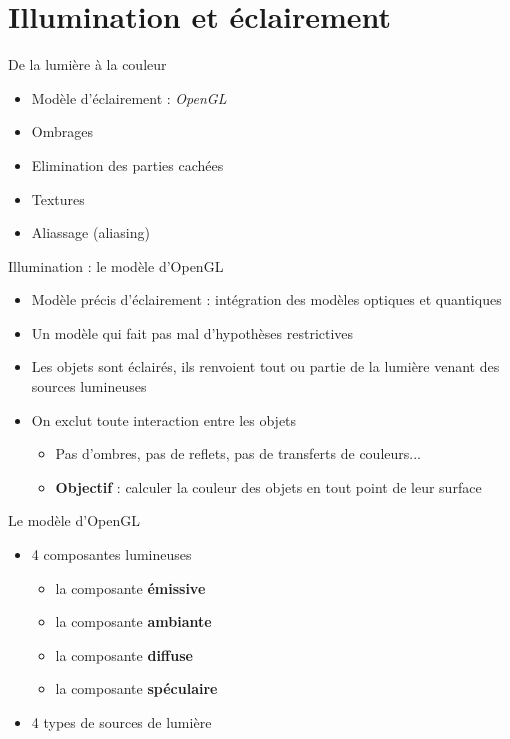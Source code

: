 \section{Illumination et éclairement}

\begin{frame}{De la lumière à la couleur}
\begin{itemize}
\item Modèle d'éclairement : \textit{OpenGL}
\item Ombrages
\item Elimination des parties cachées
\item Textures
\item Aliassage (aliasing)
\end{itemize}
\end{frame}


\begin{frame}{Illumination : le modèle d'OpenGL}
\begin{itemize}
\item Modèle précis d'éclairement : intégration des modèles optiques et quantiques
\item Un modèle qui fait pas mal d'hypothèses restrictives
\item Les objets sont éclairés, ils renvoient tout ou partie de la lumière venant des sources lumineuses
\item On exclut toute interaction entre les objets
\begin{itemize}
\item Pas d'ombres, pas de reflets, pas de transferts de couleurs...
\item \textbf{Objectif} : calculer la couleur des objets en tout point de leur surface
\end{itemize}
\end{itemize}
\end{frame}

\begin{frame}[t]{Le modèle d'OpenGL}
  \begin{itemize}
    \item 4 composantes lumineuses
    \begin{itemize}
      \item la composante \textbf{émissive}
      \item la composante \textbf{ambiante}
      \item la composante \textbf{diffuse}
      \item la composante \textbf{spéculaire}
    \end{itemize}
    \item 4 types de sources de lumière
  \end{itemize}
\end{frame}

